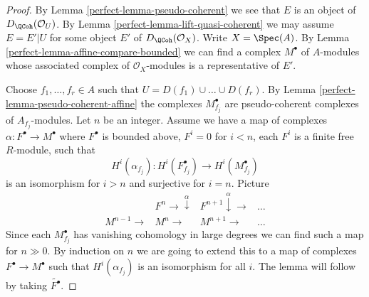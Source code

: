 \begin{proof}

By Lemma \ref{perfect-lemma-pseudo-coherent} we see that $E$ is an object of
$D_\QCoh(\mathcal{O}_U)$. By
Lemma \ref{perfect-lemma-lift-quasi-coherent}
we may assume $E = E'|U$ for some object $E'$ of
$D_\QCoh(\mathcal{O}_X)$.
Write $X = \Spec(A)$. By Lemma \ref{perfect-lemma-affine-compare-bounded}
we can find a complex $M^\bullet$ of $A$-modules whose associated
complex of $\mathcal{O}_X$-modules is a representative of $E'$.

\medskip\noindent
Choose $f_1, \ldots, f_r \in A$ such that $U = D(f_1) \cup \ldots \cup D(f_r)$.
By Lemma \ref{perfect-lemma-pseudo-coherent-affine} the complexes
$M^\bullet_{f_j}$ are pseudo-coherent complexes of $A_{f_j}$-modules.
Let $n$ be an integer. Assume we have a map of complexes
$\alpha : F^\bullet \to M^\bullet$ where $F^\bullet$ is
bounded above, $F^i = 0$ for $i < n$, each $F^i$ is a finite free
$R$-module, such that
$$
H^i(\alpha_{f_j}) : H^i(F^\bullet_{f_j}) \to H^i(M^\bullet_{f_j})
$$
is an isomorphism for $i > n$ and surjective for $i = n$. Picture
$$
\begin{array}{cccc} & F^n \longrightarrow\overset{\alpha}{\downarrow} & F^{n + 1} \overset{\alpha}{\downarrow}\longrightarrow & \ldots \\ M^{n-1} \longrightarrow & M^n \longrightarrow & M^{n + 1} \longrightarrow & \ldots\end{array}
$$
Since each $M^\bullet_{f_j}$ has vanishing cohomology
in large degrees we can find such a map for $n \gg 0$.
By induction on $n$ we are going to extend this to a map
of complexes $F^\bullet \to M^\bullet$
such that $H^i(\alpha_{f_j})$ is an isomorphism
for all $i$. The lemma will follow by taking $\widetilde{F^\bullet}$.


\end{proof}
